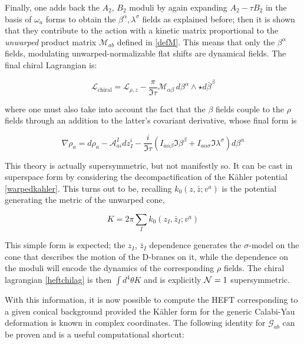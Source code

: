 Finally, one adds back the $A_2$, $B_2$ moduli by again expanding $A_2 - \tau B_2$ in the basis of $\omega_a$ forms to obtain the $\beta^\alpha, \lambda^\sigma$ fields as explained before; then it is shown that they contribute to the action with a kinetic matrix proportional to the \emph{unwarped} product matrix $\mathcal{M}_{ab}$ defined in \ref{defM}. This means that only the $\beta^\alpha$ fields, modulating unwarped-normalizable flat shifts are dynamical fields. The final chiral Lagrangian is:

\begin{equation}
	\mathcal{L}_\text{chiral} = \mathcal{L}_{\rho,z} - \frac{\pi}{\Im\tau} \mathcal{M}_{\alpha\beta} \,d\beta^\alpha \wedge \star d\bar \beta^\beta
	\label{heftchilag}
\end{equation}

where one must also take into account the fact that the $\beta$ fields couple to the $\rho$ fields through an addition to the latter's covariant derivative, whose final form is

\begin{equation}
	\nabla \rho_a = d\rho_a - \mathcal{A}_{ai}^I dz^i_I - \frac{i}{\Im \tau}\left( I_{a\alpha\beta} \Im \beta^\beta + I_{a\alpha\sigma} \Im \lambda^\sigma \right) d\beta^\alpha
	\label{}
\end{equation}

This theory is actually supersymmetric, but not manifestly so. It can be cast in superspace form by considering the decompactification of the K\"ahler potential \eqref{warpedkahler}. This turns out to be, recalling $k_0(z,\bar z; v^a)$ is the potential generating the metric of the unwarped cone,

\begin{equation}
	K = 2\pi \sum_I k_0(z_I, \bar z_I; v^a)
	\label{heftkahler}
\end{equation}

This simple form is expected; the $z_I$, $\bar z_I$ dependence generates the $\sigma$-model on the cone that describes the motion of the D-branes on it, while the dependence on the moduli will encode the dynamics of the corresponding $\rho$ fields. The chiral lagrangian \eqref{heftchilag} is then $\int d^4 \theta K$ and is explicitly $\mathcal{N} = 1$ supersymmetric.

With this information, it is now possible to compute the HEFT corresponding to a given conical background provided the K\"ahler form for the generic Calabi-Yau deformation is known in complex coordinates. The following identity for $\mathcal{G}_{ab}$ can be proven\cite{MZ} and is a useful computational shortcut:

